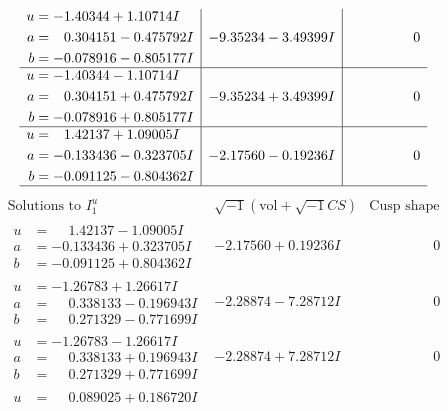 \documentclass[1p]{elsarticle_modified}
\theoremstyle{definition}
\newcommand{\I}{\sqrt{-1}}
\begin{document}
$$\begin{array}{c|c|c}
\begin{aligned}
u &= -1.40344 + 1.10714 I \\
a &= \phantom{-}0.304151 - 0.475792 I \\
b &= -0.078916 - 0.805177 I\end{aligned}
 & -9.35234 - 3.49399 I & \phantom{-0.000000 } 0 \\ \hline\begin{aligned}
u &= -1.40344 - 1.10714 I \\
a &= \phantom{-}0.304151 + 0.475792 I \\
b &= -0.078916 + 0.805177 I\end{aligned}
 & -9.35234 + 3.49399 I & \phantom{-0.000000 } 0 \\ \hline\begin{aligned}
u &= \phantom{-}1.42137 + 1.09005 I \\
a &= -0.133436 - 0.323705 I \\
b &= -0.091125 - 0.804362 I\end{aligned}
 & -2.17560 - 0.19236 I & \phantom{-0.000000 } 0\\
 \hline 
 \end{array}$$\newpage$$\begin{array}{c|c|c}  
\text{Solutions to }I^u_{1}& \I (\text{vol} + \sqrt{-1}CS) & \text{Cusp shape}\\
 \hline 
\begin{aligned}
u &= \phantom{-}1.42137 - 1.09005 I \\
a &= -0.133436 + 0.323705 I \\
b &= -0.091125 + 0.804362 I\end{aligned}
 & -2.17560 + 0.19236 I & \phantom{-0.000000 } 0 \\ \hline\begin{aligned}
u &= -1.26783 + 1.26617 I \\
a &= \phantom{-}0.338133 - 0.196943 I \\
b &= \phantom{-}0.271329 - 0.771699 I\end{aligned}
 & -2.28874 - 7.28712 I & \phantom{-0.000000 } 0 \\ \hline\begin{aligned}
u &= -1.26783 - 1.26617 I \\
a &= \phantom{-}0.338133 + 0.196943 I \\
b &= \phantom{-}0.271329 + 0.771699 I\end{aligned}
 & -2.28874 + 7.28712 I & \phantom{-0.000000 } 0 \\ \hline\begin{aligned}
u &= \phantom{-}0.089025 + 0.186720 I \\

\end{aligned}
\end{array}$$
\end{document}
